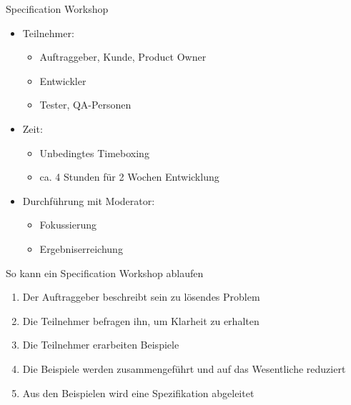 \begin{frame}{Specification Workshop}

\begin{itemize}
	\item Teilnehmer: 
	\begin{itemize}
		\item Auftraggeber, Kunde, Product Owner
		\item Entwickler
		\item Tester, QA-Personen
	\end{itemize}
	\item Zeit: 
	\begin{itemize}
		\item Unbedingtes Timeboxing
		\item ca. 4 Stunden für 2 Wochen Entwicklung
	\end{itemize}
	\item Durchführung mit Moderator: 
	\begin{itemize}
		\item Fokussierung
		\item Ergebniserreichung
	\end{itemize}
\end{itemize}

\end{frame}



\begin{frame}{So kann ein Specification Workshop ablaufen}

\begin{enumerate}
	\item Der Auftraggeber beschreibt sein zu lösendes Problem
	\item Die Teilnehmer befragen ihn, um Klarheit zu erhalten
	\item Die Teilnehmer erarbeiten Beispiele
	\item Die Beispiele werden zusammengeführt und auf das Wesentliche reduziert
	\item Aus den Beispielen wird eine Spezifikation abgeleitet
\end{enumerate}

\end{frame}


